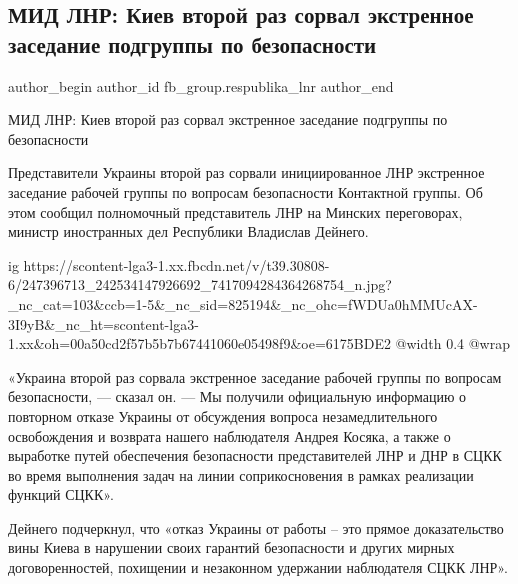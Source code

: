  
 
 
 
 
 
\subsection{МИД ЛНР:  Киев второй раз сорвал экстренное заседание подгруппы по безопасности}
\label{sec:20_10_2021.fb.fb_group.respublika_lnr.1.kiev_peregovory_sryv}
 
\ifcmt
 author_begin
   author_id fb_group.respublika_lnr
 author_end
\fi

МИД ЛНР:  Киев второй раз сорвал экстренное заседание подгруппы по безопасности 

Представители Украины второй раз сорвали инициированное ЛНР экстренное
заседание рабочей группы по вопросам безопасности Контактной группы. Об этом
сообщил полномочный представитель ЛНР на Минских переговорах, министр
иностранных дел Республики Владислав Дейнего.

\ifcmt
  ig https://scontent-lga3-1.xx.fbcdn.net/v/t39.30808-6/247396713_242534147926692_7417094284364268754_n.jpg?_nc_cat=103&ccb=1-5&_nc_sid=825194&_nc_ohc=fWDUa0hMMUcAX-3I9yB&_nc_ht=scontent-lga3-1.xx&oh=00a50cd2f57b5b7b67441060e05498f9&oe=6175BDE2
  @width 0.4
  @wrap 
\fi

«Украина второй раз сорвала экстренное заседание рабочей группы по вопросам
безопасности, — сказал он. — Мы получили официальную информацию о повторном
отказе Украины от обсуждения вопроса незамедлительного освобождения и возврата
нашего наблюдателя Андрея Косяка, а также о выработке путей обеспечения
безопасности представителей ЛНР и ДНР в СЦКК во время выполнения задач на линии
соприкосновения в рамках реализации функций СЦКК».

Дейнего подчеркнул, что «отказ Украины от работы – это прямое доказательство
вины Киева в нарушении своих гарантий безопасности и других мирных
договоренностей, похищении и незаконном удержании наблюдателя СЦКК ЛНР».

